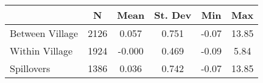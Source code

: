 \begin{tabular}{l*{5}{c}}\hline&\multicolumn{1}{c}{N}&\multicolumn{1}{c}{Mean}&\multicolumn{1}{c}{St. Dev}&\multicolumn{1}{c}{Min}&\multicolumn{1}{c}{Max}\\ \hline 
Between Village & 2126 & 0.057 & 0.751 & -0.07 & 13.85 \\
Within Village & 1924 & -0.000 & 0.469 & -0.09 & 5.84 \\
Spillovers & 1386 & 0.036 & 0.742 & -0.07 & 13.85 \\
\hline \end{tabular}
